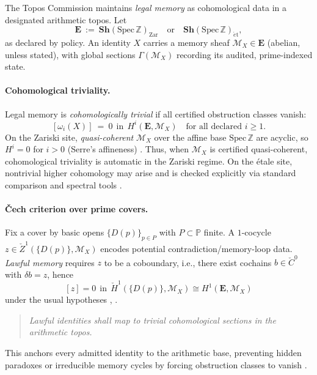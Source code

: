 \documentclass[12pt]{amsart}
\theoremstyle{plain}
\begin{document}
The Topos Commission maintains \emph{legal memory} as cohomological data in a designated arithmetic topos. Let
\[
\mathbf{E}\ :=\ \mathbf{Sh}(\mathrm{Spec}\,\mathbb{Z})_{\mathrm{Zar}}
\quad\text{or}\quad
\mathbf{Sh}(\mathrm{Spec}\,\mathbb{Z})_{\acute{e}\mathrm{t}},
\]
as declared by policy. An identity $X$ carries a memory sheaf $\mathscr{M}_X\in\mathbf{E}$ (abelian, unless stated), with global sections $\Gamma(\mathscr{M}_X)$ recording its audited, prime-indexed state.

\paragraph{Cohomological triviality.}
Legal memory is \emph{cohomologically trivial} if all certified obstruction classes vanish:
\[
[\omega_i(X)]\ =\ 0\ \ \text{in}\ \ H^i(\mathbf{E},\mathscr{M}_X)\quad\text{for all declared }i\ge 1.
\]
On the Zariski site, \emph{quasi-coherent} $\mathscr{M}_X$ over the affine base $\mathrm{Spec}\,\mathbb{Z}$ are acyclic, so $H^i=0$ for $i>0$ (Serre’s affineness) \cite[III.3.5]{hartshorne1977algebraic}. Thus, when $\mathscr{M}_X$ is certified quasi-coherent, cohomological triviality is automatic in the Zariski regime. On the étale site, nontrivial higher cohomology may arise and is checked explicitly via standard comparison and spectral tools \cite{milne1980etale,SGA4}.

\paragraph{Čech criterion over prime covers.}
Fix a cover by basic opens $\{D(p)\}_{p\in P}$ with $P\subset\mathbb{P}$ finite. A $1$-cocycle $z\in \check{Z}^1(\{D(p)\},\mathscr{M}_X)$ encodes potential contradiction/memory-loop data. \emph{Lawful memory} requires $z$ to be a coboundary, i.e., there exist cochains $b\in \check{C}^{0}$ with $\delta b=z$, hence
\[
[\!z\!]=0\ \ \text{in}\ \ \check{H}^1(\{D(p)\},\mathscr{M}_X)\cong H^1(\mathbf{E},\mathscr{M}_X)
\]
under the usual hypotheses \cite[III.4]{hartshorne1977algebraic}, \cite[VI]{maclane1992sheaves}.

\begin{quote}
\textit{Lawful identities shall map to trivial cohomological sections in the arithmetic topos.}
\end{quote}

This anchors every admitted identity to the arithmetic base, preventing hidden paradoxes or irreducible memory cycles by forcing obstruction classes to vanish \cite{johnstone2002elephant,maclane1992sheaves}.
\end{document}
